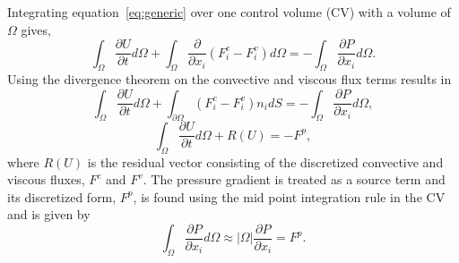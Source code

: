 \noindent Integrating equation~\ref{eq:generic} over one control volume (CV) with a volume of $\Omega$ gives,
\begin{equation}
\int_{\Omega}\frac{\partial U}{\partial t}d\Omega + \int_{\Omega}\frac{\partial}{\partial x_i} (F^c_i-F^v_i)d\Omega = -\int_{\Omega}\frac{\partial P}{\partial x_i} d\Omega.
\end{equation}
Using the divergence theorem on the convective and viscous flux terms results in
\begin{equation*}
\int_{\Omega}\frac{\partial U}{\partial t}d\Omega+\int_{\partial\Omega}(F^c_i-F^v_i)n_i dS=-\int_{\Omega} \frac{\partial P}{\partial x_i}d\Omega,
\end{equation*}
\begin{equation}
\int_{\Omega}\frac{\partial U}{\partial t}d\Omega +R(U)=-F^{p},
\label{eq:fvmeqn}
\end{equation}
where $R(U)$ is the residual vector consisting of the discretized convective and viscous fluxes, $F^c$ and $F^v$. The pressure gradient is treated as a source term and its discretized form, $F^p$, is found using the mid point integration rule in the CV and is given by
\begin{equation}
\int_{\Omega} \frac{\partial P}{\partial x_i}d\Omega  \approx |\Omega|\frac{\partial P}{\partial x_i} = F^{p}.
\label{eq:pressapprox}
\end{equation}

